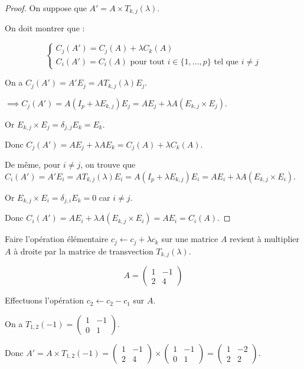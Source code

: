 \documentclass[12pt, a4paper]{report}
\begin{document}
\begin{proof}
    On suppose que $A' = A \times T_{k,j}(\lambda)$.

    On doit montrer que :

    $$\begin{cases}
        C_j(A') = C_j(A) + \lambda C_k(A) \\
        C_i(A') = C_i(A) \text{ pour tout } i \in \{1,\dots,p\} \text{ tel que } i \ne j
    \end{cases}$$

    On a $C_j(A') = A' E_j = A T_{k,j}(\lambda) E_j$.

    $\implies C_j(A') = A(I_p + \lambda E_{k,j}) E_j = A E_j + \lambda A (E_{k,j}\times E_j)$.

    Or $E_{k,j}\times E_j = \delta_{j,j} E_k = E_k$.

    Donc $C_j(A') = A E_j + \lambda A E_k = C_j(A) + \lambda C_k(A)$.

    De même, pour $i \ne j$, on trouve que $C_i(A') = A' E_i = A T_{k,j}(\lambda) E_i = A (I_p + \lambda E_{k,j}) E_i = A E_i + \lambda A (E_{k,j}\times E_i)$.

    Or $E_{k,j}\times E_i = \delta_{j,i} E_k = 0$ car $i \ne j$.

    Donc $C_i(A') = A E_i + \lambda A (E_{k,j}\times E_i) = A E_i = C_i(A)$.

\end{proof}

\begin{remark}
    Faire l'opération élémentaire $c_j \leftarrow c_j + \lambda c_k$ sur une matrice $A$ revient à multiplier $A$ à droite par la matrice de transvection $T_{k,j}(\lambda)$.
\end{remark}

\begin{example}
    $$A = \left(\begin{matrix} 1 & -1 \\ 2 & 4 \end{matrix}\right)$$

    Effectuons l'opération $c_2 \leftarrow c_2 - c_1$ sur $A$.

    On a $T_{1,2}(-1) = \left(\begin{matrix} 1 & -1 \\ 0 & 1 \end{matrix}\right)$.

    Donc $A' = A \times T_{1,2}(-1) = \left(\begin{matrix} 1 & -1 \\ 2 & 4 \end{matrix}\right) \times \left(\begin{matrix} 1 & -1 \\ 0 & 1 \end{matrix}\right) = \left(\begin{matrix} 1 & -2 \\ 2 & 2 \end{matrix}\right)$.
\end{example}
\end{document}
